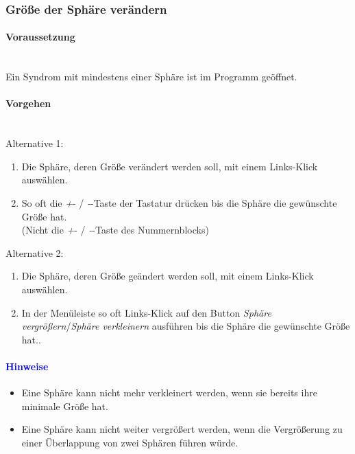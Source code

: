 \documentclass[enabledeprecatedfontcommands,fontsize=11pt,paper=a4,twoside]{scrartcl}
\newcommand*{\hint}{\paragraph{\textcolor{blue}{Hinweise}}}
\newcommand*{\condition}{\paragraph{Voraussetzung}$\;$ \vspace{0.2cm}\\}
\newcommand*{\actions}{\paragraph{Vorgehen} $\;$\vspace{0.2cm}\\}
\begin{document}
				\newpage	
		\subsubsection{Größe der Sphäre verändern}
				\condition 	
		Ein Syndrom mit mindestens einer Sphäre ist im Programm geöffnet. 
		\actions  
		Alternative 1:
		\begin{enumerate}
			\item Die Sphäre, deren Größe verändert werden soll, mit einem Links-Klick auswählen.
			\item So oft die \glqq\textit{+}\grqq- / \glqq\textit{-}\grqq-Taste der Tastatur drücken bis die Sphäre die gewünschte Größe hat. \\(Nicht die \glqq\textit{+}\grqq- / \glqq\textit{-}\grqq-Taste des Nummernblocks)
		\end{enumerate}
		Alternative 2:
			\begin{enumerate}
			\item Die Sphäre, deren Größe geändert werden soll, mit einem Links-Klick auswählen.
			\item In der Menüleiste so oft  Links-Klick auf den Button \textit{Sphäre vergrößern}/\textit{Sphäre verkleinern} ausführen bis die Sphäre die gewünschte Größe hat.. 
		\end{enumerate}
		\hint
		\begin{itemize}
			\item Eine Sphäre kann nicht mehr verkleinert werden, wenn sie bereits ihre minimale Größe hat.
			\item Eine Sphäre kann nicht weiter vergrößert werden, wenn die Vergrößerung zu einer Überlappung von zwei Sphären führen würde.
			\end{itemize}
			
					\newpage	
\end{document}
